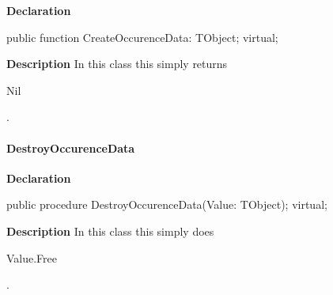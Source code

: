 \documentclass{report}
\newif\ifpdf
\begin{document}
\label{PasDoc_TagManager.TTag-CreateOccurenceData}
\begin{list}{}{
\setlength{\itemindent}{0cm}
\setlength{\listparindent}{0cm}
\setlength{\leftmargin}{\evensidemargin}
\addtolength{\leftmargin}{\tmplength}
\settowidth{\labelsep}{X}
\addtolength{\leftmargin}{\labelsep}
\setlength{\labelwidth}{\tmplength}
}
\item[\textbf{Declaration}\hfill]
\ifpdf
\begin{flushleft}
\fi
\begin{ttfamily}
public function CreateOccurenceData: TObject; virtual;\end{ttfamily}

\ifpdf
\end{flushleft}
\fi

\par
\item[\textbf{Description}]
In this class this simply returns \begin{ttfamily}Nil\end{ttfamily}.

\end{list}
\paragraph*{DestroyOccurenceData}\hspace*{\fill}

\label{PasDoc_TagManager.TTag-DestroyOccurenceData}
\begin{list}{}{
\setlength{\itemindent}{0cm}
\setlength{\listparindent}{0cm}
\setlength{\leftmargin}{\evensidemargin}
\addtolength{\leftmargin}{\tmplength}
\settowidth{\labelsep}{X}
\addtolength{\leftmargin}{\labelsep}
\setlength{\labelwidth}{\tmplength}
}
\item[\textbf{Declaration}\hfill]
\ifpdf
\begin{flushleft}
\fi
\begin{ttfamily}
public procedure DestroyOccurenceData(Value: TObject); virtual;\end{ttfamily}

\ifpdf
\end{flushleft}
\fi

\par
\item[\textbf{Description}]
In this class this simply does \begin{ttfamily}Value.Free\end{ttfamily}.

\end{list}
\ifpdf
\end{document}
